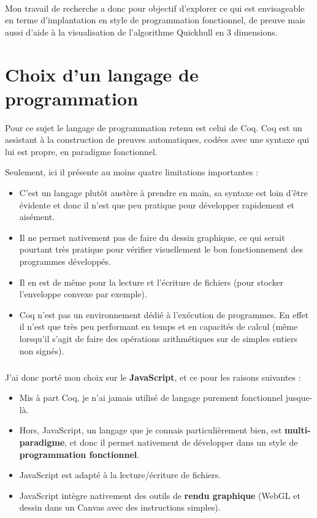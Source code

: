 \documentclass[]{article}
\begin{document}
\paragraph{}
Mon travail de recherche a donc pour objectif d'explorer ce qui est envisageable en terme d'implantation en style de programmation fonctionnel, de preuve mais aussi d'aide à la visualisation de l'algorithme Quickhull en 3 dimensions.

\section{Choix d'un langage de programmation}
Pour ce sujet le langage de programmation retenu est celui de Coq. Coq est un assistant à la construction de preuves automatiques, codées avec une syntaxe qui lui est propre, en paradigme fonctionnel.

Seulement, ici il présente au moins quatre limitations importantes :
\begin{itemize}
	\item C'est un langage plutôt austère à prendre en main, sa syntaxe est loin d'être évidente et donc il n'est que peu pratique pour développer rapidement et aisément.
	\item Il ne permet nativement pas de faire du dessin graphique, ce qui serait pourtant très pratique pour vérifier visuellement le bon fonctionnement des programmes développés.
	\item Il en est de même pour la lecture et l'écriture de fichiers (pour stocker l'enveloppe convexe par exemple).
	\item Coq n'est pas un environnement dédié à l'exécution de programmes. En effet il n'est que très peu performant en temps et en capacités de calcul (même lorsqu'il s'agit de faire des opérations arithmétiques sur de simples entiers non signés).
\end{itemize}

\subparagraph{}
J'ai donc porté mon choix sur le \textbf{JavaScript}, et ce pour les raisons suivantes :
\begin{itemize}
	\item Mis à part Coq, je n'ai jamais utilisé de langage purement fonctionnel jusque-là.
	\item Hors, JavaScript, un langage que je connais particulièrement bien, est \textbf{multi-paradigme}, et donc il permet nativement de développer dans un style de \textbf{programmation fonctionnel}.
	\item JavaScript est adapté à la lecture/écriture de fichiers.
	\item JavaScript intègre nativement des outils de \textbf{rendu graphique} (WebGL et dessin dans un Canvas avec des instructions simples).
\end{itemize}
\end{document}

